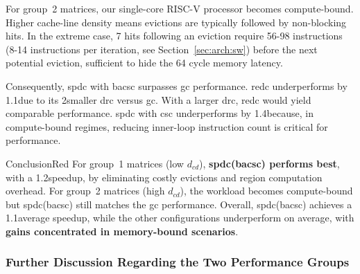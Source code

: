 For group~2 matrices, our single-core RISC-V processor becomes compute-bound.
Higher cache-line density means \glspl{eviction} are typically followed by non-blocking \glspl{hit}.
In the extreme case, 7 \glspl{hit} following an \gls{eviction} require 56-98 instructions (8-14 instructions per iteration, see Section~\ref{sec:arch:sw}) before the next potential \gls{eviction}, sufficient to hide the 64 cycle memory latency.

Consequently, \acrlong{spdc} with \acrshort{bacsc} surpasses \acrshort{gc} performance.
\acrshort{redc} underperforms by 1.1\tms due to its 2\tms smaller \acrshort{drc} versus \acrshort{gc}.
With a larger \acrshort{drc}, \acrshort{redc} would yield comparable performance.
\acrlong{spdc} with \acrshort{csc} underperforms by 1.4\tms because, in compute-bound regimes, reducing inner-loop instruction count is critical for performance.

\begin{highlight}{Conclusion}{Red}
    For group~1 matrices (low $d_\mathit{cd}$), \textbf{\acrlong{spdc}(\acrshort{bacsc}) performs best}, with a 1.2\tms speedup, by eliminating costly \glspl{eviction} and region computation overhead.
    For group~2 matrices (high $d_\mathit{cd}$), the workload becomes compute-bound but \acrlong{spdc}(\acrshort{bacsc}) still matches the \acrshort{gc} performance.
    Overall, \acrlong{spdc}(\acrshort{bacsc}) achieves a 1.1\tms average speedup, while the other configurations underperform on average, with \textbf{gains concentrated in memory-bound scenarios}.
\end{highlight}

\subsubsection{Further Discussion Regarding the Two Performance Groups}
\label{sec:arch:perfGroups}

